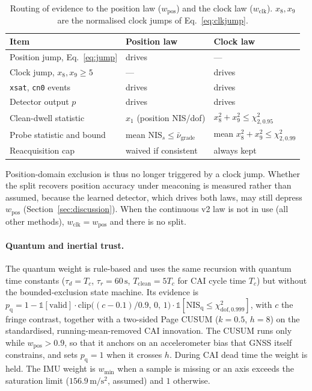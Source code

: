\documentclass[journal]{IEEEtran}
\begin{document}
\begin{table}[t]
\centering
\caption{Routing of evidence to the position law ($w_{\mathrm{pos}}$) and the clock law ($w_{\mathrm{clk}}$).
$x_8, x_9$ are the normalised clock jumps of Eq.~\eqref{eq:clkjump}.}
\label{tab:trustsplit}
\footnotesize
\begin{tabular}{p{2.6cm}p{2.5cm}p{2.5cm}}
\toprule
Item & Position law & Clock law \\
\midrule
Position jump, Eq.~\eqref{eq:jump} & drives & --- \\
Clock jump, $x_8, x_9 \ge 5$ & --- & drives \\
\texttt{xsat}, \texttt{cn0} events & drives & drives \\
Detector output $p$ & drives & drives \\
Clean-dwell statistic & $x_1$ (position NIS/dof) & $x_8^2 + x_9^2 \le \chi^2_{2,0.95}$ \\
Probe statistic and bound & mean $\mathrm{NIS}_s \le \bar\nu_{\mathrm{grade}}$ & mean $x_8^2 + x_9^2 \le \chi^2_{2,0.99}$ \\
Reacquisition cap & waived if consistent & always kept \\
\bottomrule
\end{tabular}
\end{table}

\noindent Position-domain exclusion is thus no longer triggered by a clock jump. Whether the split recovers
position accuracy under meaconing is measured rather than assumed, because the learned detector, which drives
both laws, may still depress $w_{\mathrm{pos}}$ (Section~\ref{sec:discussion}). When the continuous v2 law is not
in use (all other methods), $w_{\mathrm{clk}} = w_{\mathrm{pos}}$ and there is no split.

\paragraph{Quantum and inertial trust.}
The quantum weight is rule-based and uses the same recursion with quantum time constants
($\tau_d = T_c$, $\tau_r = 60\,\mathrm{s}$, $T_{\mathrm{clean}} = 5T_c$ for CAI cycle time $T_c$) but without the
bounded-exclusion state machine. Its evidence is
$p_{\mathrm{q}} = 1 - \mathbb{1}[\text{valid}]\cdot\mathrm{clip}\big((c - 0.1)/0.9,\,0,\,1\big)\cdot\mathbb{1}[\mathrm{NIS}_{\mathrm{q}} \le \chi^2_{\mathrm{dof},0.999}]$,
with $c$ the fringe contrast, together with a two-sided Page CUSUM ($k = 0.5$, $h = 8$) on the
standardised, running-mean-removed CAI innovation. The CUSUM runs only while $w_{\mathrm{pos}} > 0.9$, so that it
anchors on an accelerometer bias that GNSS itself constrains, and sets $p_{\mathrm{q}} = 1$ when it crosses $h$.
During CAI dead time the weight is held. The IMU weight is $w_{\min}$ when a sample is missing or an axis
exceeds the saturation limit ($156.9\,\mathrm{m/s^2}$, assumed) and $1$ otherwise.
\end{document}
